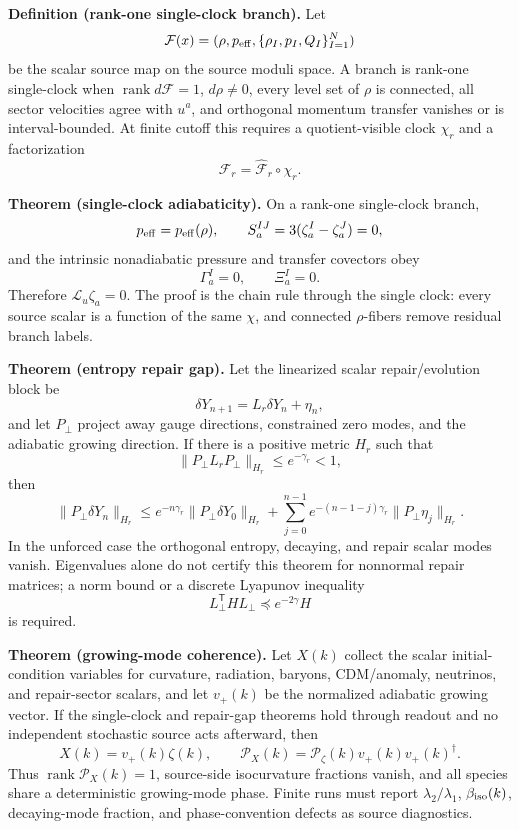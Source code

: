 \textbf{Definition (rank-one single-clock branch).}\label{def:oph-single-clock}
Let
\[
\mathcal F(x)=
(\rho,p_{\rm eff},\{\rho_I,p_I,Q_I\}_{I=1}^N)
\]
be the scalar source map on the source moduli space.  A branch is rank-one
single-clock when \(\operatorname{rank}d\mathcal F=1\), \(d\rho\ne0\), every
level set of \(\rho\) is connected, all sector velocities agree with \(u^a\),
and orthogonal momentum transfer vanishes or is interval-bounded.  At finite
cutoff this requires a quotient-visible clock \(\chi_r\) and a factorization
\[
\mathcal F_r=\widehat{\mathcal F}_r\circ\chi_r .
\]

\textbf{Theorem (single-clock adiabaticity).}\label{thm:oph-single-clock-adiabaticity}
On a rank-one single-clock branch,
\[
p_{\rm eff}=p_{\rm eff}(\rho),\qquad
S_a^{IJ}=3(\zeta_a^I-\zeta_a^J)=0,
\]
and the intrinsic nonadiabatic pressure and transfer covectors obey
\[
\Gamma_a^I=0,\qquad \Xi_a^I=0 .
\]
Therefore \(\mathcal L_u\zeta_a=0\).  The proof is the chain rule through the
single clock: every source scalar is a function of the same \(\chi\), and
connected \(\rho\)-fibers remove residual branch labels.

\textbf{Theorem (entropy repair gap).}\label{thm:oph-entropy-repair-gap}
Let the linearized scalar repair/evolution block be
\[
\delta Y_{n+1}=L_r\delta Y_n+\eta_n,
\]
and let \(P_\perp\) project away gauge directions, constrained zero modes, and
the adiabatic growing direction.  If there is a positive metric \(H_r\) such
that
\[
\|P_\perp L_rP_\perp\|_{H_r}\le e^{-\gamma_r}<1,
\]
then
\[
\|P_\perp\delta Y_n\|_{H_r}
\le
e^{-n\gamma_r}\|P_\perp\delta Y_0\|_{H_r}
+
\sum_{j=0}^{n-1}e^{-(n-1-j)\gamma_r}\|P_\perp\eta_j\|_{H_r}.
\]
In the unforced case the orthogonal entropy, decaying, and repair scalar
modes vanish.  Eigenvalues alone do not certify this theorem for nonnormal
repair matrices; a norm bound or a discrete Lyapunov inequality
\[
L_\perp^{\mathsf T}H L_\perp\preceq e^{-2\gamma}H
\]
is required.

\textbf{Theorem (growing-mode coherence).}\label{thm:oph-growing-mode-coherence}
Let \(X(k)\) collect the scalar initial-condition variables for curvature,
radiation, baryons, CDM/anomaly, neutrinos, and repair-sector scalars, and let
\(v_+(k)\) be the normalized adiabatic growing vector.  If the single-clock
and repair-gap theorems hold through readout and no independent stochastic
source acts afterward, then
\[
X(k)=v_+(k)\zeta(k),
\qquad
\mathcal P_X(k)=\mathcal P_\zeta(k)v_+(k)v_+(k)^\dagger .
\]
Thus \(\operatorname{rank}\mathcal P_X(k)=1\), source-side isocurvature
fractions vanish, and all species share a deterministic growing-mode phase.
Finite runs must report \(\lambda_2/\lambda_1\), \(\beta_{\rm iso}(k)\),
decaying-mode fraction, and phase-convention defects as source diagnostics.

